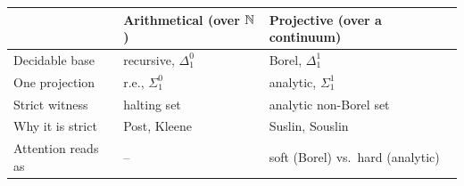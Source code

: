 \begin{center}
\small
\begin{tabular}{lll}
\toprule
 & \textbf{Arithmetical (over $\mathbb{N}$)} & \textbf{Projective (over a continuum)} \\
\midrule
Decidable base       & recursive, $\Delta^0_1$ & Borel, $\Delta^1_1$ \\
One projection       & r.e., $\Sigma^0_1$      & analytic, $\Sigma^1_1$ \\
Strict witness       & halting set             & analytic non-Borel set \\
Why it is strict     & Post, Kleene            & Suslin, Souslin \\
Attention reads as   & --                      & soft (Borel) vs.\ hard (analytic) \\
\bottomrule
\end{tabular}
\end{center}

